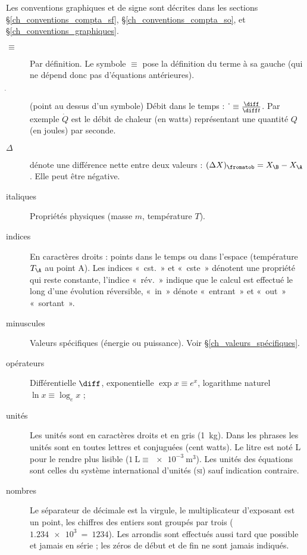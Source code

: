 
\TabPositions{2cm}

Les conventions graphiques et de signe sont décrites dans les sections \S\ref{ch_conventions_compta_sf}, \S\ref{ch_conventions_compta_so}, et \S\ref{ch_conventions_graphiques}.

\begin{description}
	\item[$\equiv$] 	\tab Par définition. Le symbole $\equiv$ pose la définition du terme à sa gauche (qui ne dépend donc pas d’équations antérieures).
	\item[$\dot~$]		\tab (point au dessus d’un symbole) Débit dans le temps : $\dot~ \equiv \frac{\diff}{\diff t}$. Par exemple $\dot Q$ est le débit de chaleur (en \si{watts}) représentant une quantité $Q$ (en \si{joules}) par \si{seconde}.
	\item[$\Delta$]	\tab dénote une différence nette entre deux valeurs : $(\Delta X)_\fromatob = X_\B - X_\A$. Elle peut être négative.
	\item[italiques] 	Propriétés physiques (masse $m$, température $T$).
	\item[indices]		En caractères droits : points dans le temps ou dans l’espace (température $T_\A$ au point A). Les indices «~cst.~» et «~cste~» dénotent une propriété qui reste constante, l’indice «~rév.~» indique que le calcul est effectué le long d’une évolution réversible, «~in~» dénote «~entrant~» et «~out~» «~sortant~».
	\item[minuscules]	Valeurs spécifiques (énergie ou puissance). Voir \S\ref{ch_valeurs_spécifiques}.
	\item[opérateurs]	Différentielle $\diff$, exponentielle $\exp x \equiv e^x $, logarithme naturel $\ln x \equiv \log_e x$ ;
	\item[unités]		Les unités sont en caractères droits et en gris (\SI{1}{\kilogram}). Dans les phrases les unités sont en toutes lettres et conjuguées (cent \si{watts}). Le \si{litre} est noté \si{\liter} pour le rendre plus lisible ($\SI{1}{\liter} \equiv \SI{e-3}{\metre\cubed}$). Les unités des équations sont celles du système international d’unités (\textsc{si}) sauf indication contraire.
	\item[nombres]		Le séparateur de décimale est la virgule, le multiplicateur d’exposant est un point, les chiffres des entiers sont groupés par trois ($\SI{1,234e3} ~=~ \num{1234}$). Les arrondis sont effectués aussi tard que possible et jamais en série ; les zéros de début et de fin ne sont jamais indiqués.
\end{description}
